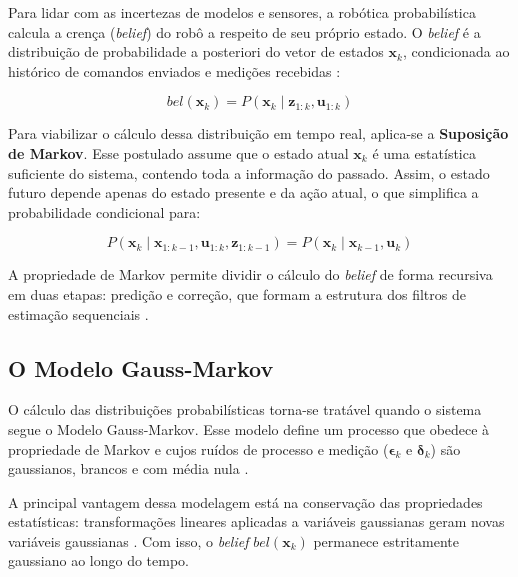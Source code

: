 Para lidar com as incertezas de modelos e sensores, a robótica probabilística calcula a crença (\textit{belief}) do robô a respeito de seu próprio estado. O \textit{belief} é a distribuição de probabilidade a posteriori do vetor de estados $\mathbf{x}_k$, condicionada ao histórico de comandos enviados e medições recebidas \cite{thrun2005probabilistic}:

\begin{equation}
    \label{eq:belief}
    bel(\mathbf{x}_k) = P(\mathbf{x}_k \mid \mathbf{z}_{1:k}, \mathbf{u}_{1:k})
\end{equation}

Para viabilizar o cálculo dessa distribuição em tempo real, aplica-se a \textbf{Suposição de Markov}. Esse postulado assume que o estado atual $\mathbf{x}_k$ é uma estatística suficiente do sistema, contendo toda a informação do passado. Assim, o estado futuro depende apenas do estado presente e da ação atual, o que simplifica a probabilidade condicional para:

\begin{equation}
    \label{eq:suposicao_markov}
    P(\mathbf{x}_k \mid \mathbf{x}_{1:k-1}, \mathbf{u}_{1:k}, \mathbf{z}_{1:k-1}) = P(\mathbf{x}_k \mid \mathbf{x}_{k-1}, \mathbf{u}_k)
\end{equation}

A propriedade de Markov permite dividir o cálculo do \textit{belief} de forma recursiva em duas etapas: predição e correção, que formam a estrutura dos filtros de estimação sequenciais \cite{thrun2005probabilistic}.

\subsection{O Modelo Gauss-Markov}
\label{subsec:gauss_markov}

O cálculo das distribuições probabilísticas torna-se tratável quando o sistema segue o Modelo Gauss-Markov. Esse modelo define um processo que obedece à propriedade de Markov e cujos ruídos de processo e medição ($\boldsymbol{\epsilon}_k$ e $\boldsymbol{\delta}_k$) são gaussianos, brancos e com média nula \cite{simon2006optimal}.

A principal vantagem dessa modelagem está na conservação das propriedades estatísticas: transformações lineares aplicadas a variáveis gaussianas geram novas variáveis gaussianas \cite{barshalom2001estimation}. Com isso, o \textit{belief} $bel(\mathbf{x}_k)$ permanece estritamente gaussiano ao longo do tempo. 

